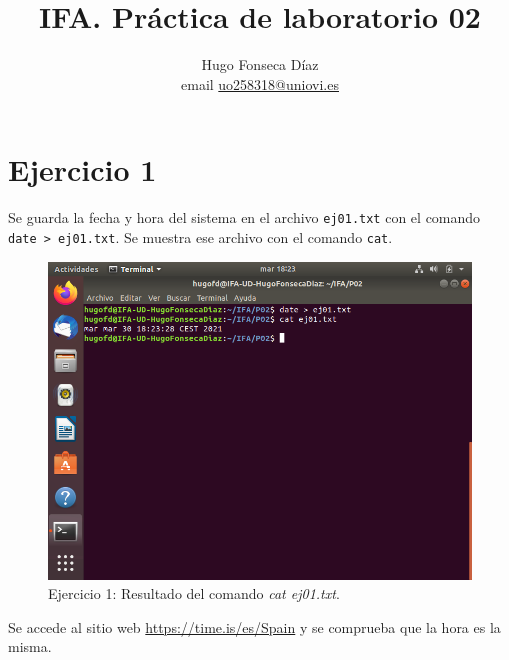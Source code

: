 \documentclass[11pt]{article}
\begin{document}
\title{IFA. Práctica de laboratorio 02}

\author{Hugo Fonseca Díaz \\ email \href{mailto:uo258318@uniovi.es}{uo258318@uniovi.es}}

\maketitle

\section{Ejercicio 1}
Se guarda la fecha y hora del sistema en el archivo \verb|ej01.txt| con el comando \verb|date > ej01.txt|. Se muestra ese archivo con el comando \verb|cat|.

\begin{figure}[H]
  \caption{Ejercicio 1: Resultado del comando \textit{cat ej01.txt}.}
  \centering
  \includegraphics[scale=0.7]{e1-1.png}
\end{figure}

Se accede al sitio web \url{https://time.is/es/Spain} y se comprueba que la hora es la misma.
\end{document}
